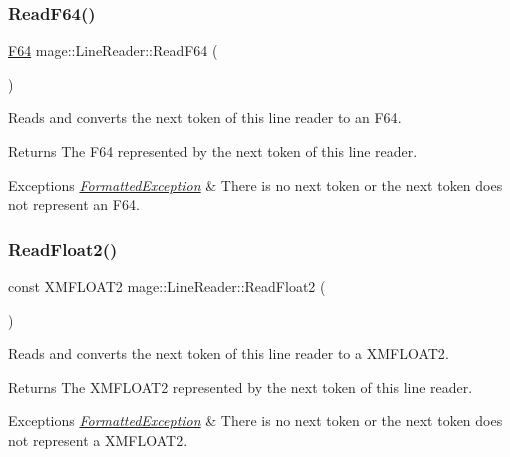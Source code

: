 \subsubsection{\texorpdfstring{Read\+F64()}{ReadF64()}}
{\footnotesize\ttfamily \hyperlink{namespacemage_ad26233bbec640deda836e572c1a23708}{F64} mage\+::\+Line\+Reader\+::\+Read\+F64 (\begin{DoxyParamCaption}{ }\end{DoxyParamCaption})\hspace{0.3cm}{\ttfamily [protected]}}

Reads and converts the next token of this line reader to an {\ttfamily F64}.

\begin{DoxyReturn}{Returns}
The {\ttfamily F64} represented by the next token of this line reader. 
\end{DoxyReturn}

\begin{DoxyExceptions}{Exceptions}
{\em \hyperlink{classmage_1_1_formatted_exception}{Formatted\+Exception}} & There is no next token or the next token does not represent an {\ttfamily F64}. \\
\hline
\end{DoxyExceptions}
\hypertarget{classmage_1_1_line_reader_ae33effd33fad465616e3acf8acdc408f}{}\label{classmage_1_1_line_reader_ae33effd33fad465616e3acf8acdc408f} 
\subsubsection{\texorpdfstring{Read\+Float2()}{ReadFloat2()}}
{\footnotesize\ttfamily const X\+M\+F\+L\+O\+A\+T2 mage\+::\+Line\+Reader\+::\+Read\+Float2 (\begin{DoxyParamCaption}{ }\end{DoxyParamCaption})\hspace{0.3cm}{\ttfamily [protected]}}

Reads and converts the next token of this line reader to a {\ttfamily X\+M\+F\+L\+O\+A\+T2}.

\begin{DoxyReturn}{Returns}
The {\ttfamily X\+M\+F\+L\+O\+A\+T2} represented by the next token of this line reader. 
\end{DoxyReturn}

\begin{DoxyExceptions}{Exceptions}
{\em \hyperlink{classmage_1_1_formatted_exception}{Formatted\+Exception}} & There is no next token or the next token does not represent a {\ttfamily X\+M\+F\+L\+O\+A\+T2}. \\
\hline
\end{DoxyExceptions}
\hypertarget{classmage_1_1_line_reader_a7a605a7c2402051f1ca4fda1e543fc28}{}\label{classmage_1_1_line_reader_a7a605a7c2402051f1ca4fda1e543fc28} 
